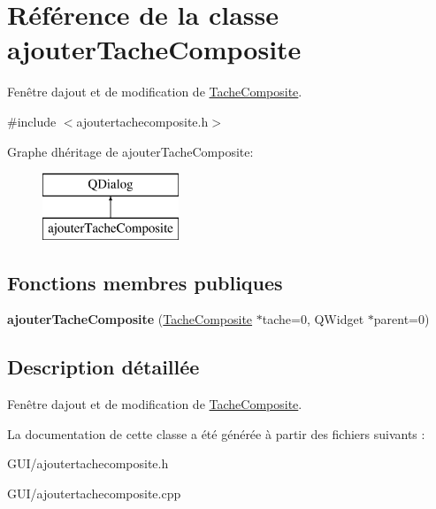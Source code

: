 \hypertarget{classajouter_tache_composite}{}\section{Référence de la classe ajouter\+Tache\+Composite}
\label{classajouter_tache_composite}


Fenêtre d\textquotesingle{}ajout et de modification de \hyperlink{class_tache_composite}{Tache\+Composite}.  




{\ttfamily \#include $<$ajoutertachecomposite.\+h$>$}

Graphe d\textquotesingle{}héritage de ajouter\+Tache\+Composite\+:\begin{figure}[H]
\begin{center}
\leavevmode
\includegraphics[height=2.000000cm]{classajouter_tache_composite}
\end{center}
\end{figure}
\subsection*{Fonctions membres publiques}
\begin{DoxyCompactItemize}
\item 
\hypertarget{classajouter_tache_composite_a831093adfc82d73e96e81d37b88d9a9b}{}{\bfseries ajouter\+Tache\+Composite} (\hyperlink{class_tache_composite}{Tache\+Composite} $\ast$tache=0, Q\+Widget $\ast$parent=0)\label{classajouter_tache_composite_a831093adfc82d73e96e81d37b88d9a9b}

\end{DoxyCompactItemize}


\subsection{Description détaillée}
Fenêtre d\textquotesingle{}ajout et de modification de \hyperlink{class_tache_composite}{Tache\+Composite}. 

La documentation de cette classe a été générée à partir des fichiers suivants \+:\begin{DoxyCompactItemize}
\item 
G\+U\+I/ajoutertachecomposite.\+h\item 
G\+U\+I/ajoutertachecomposite.\+cpp\end{DoxyCompactItemize}
